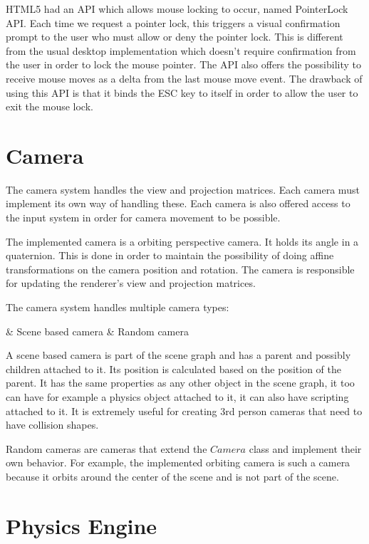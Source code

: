 HTML5 had an API which allows mouse locking to occur, named PointerLock API. Each time we request a pointer lock, this triggers a visual confirmation prompt to the user who must allow or deny the pointer lock. This is different from the usual desktop implementation which doesn't require confirmation from the user in order to lock the mouse pointer.
The API also offers the possibility to receive mouse moves as a delta from the last mouse move event. The drawback of using this API is that it binds the ESC key to itself in order to allow the user to exit the mouse lock. 


\section{Camera}

The camera system handles the view and projection matrices. Each camera must implement its own way of handling these. Each camera is also offered access to the input system in order for camera movement to be possible. 

The implemented camera is a orbiting perspective camera. It holds its angle in a quaternion. This is done in order to maintain the possibility of doing affine transformations on the camera position and rotation. The camera is responsible for updating the renderer’s view and projection matrices.

The camera system handles multiple camera types:
\begin{easylist}
& Scene based camera
& Random camera
\end{easylist}

A scene based camera is part of the scene graph and has a parent and possibly children attached to it. Its position is calculated based on the position of the parent. It has the same properties as any other object in the scene graph, it too can have for example a physics object attached to it, it can also have scripting attached to it. It is extremely useful for creating 3rd person cameras that need to have collision shapes.

Random cameras are cameras that extend the $Camera$ class and implement their own behavior. For example, the implemented orbiting camera is such a camera because it orbits around the center of the scene and is not part of the scene. 

\section{Physics Engine}

